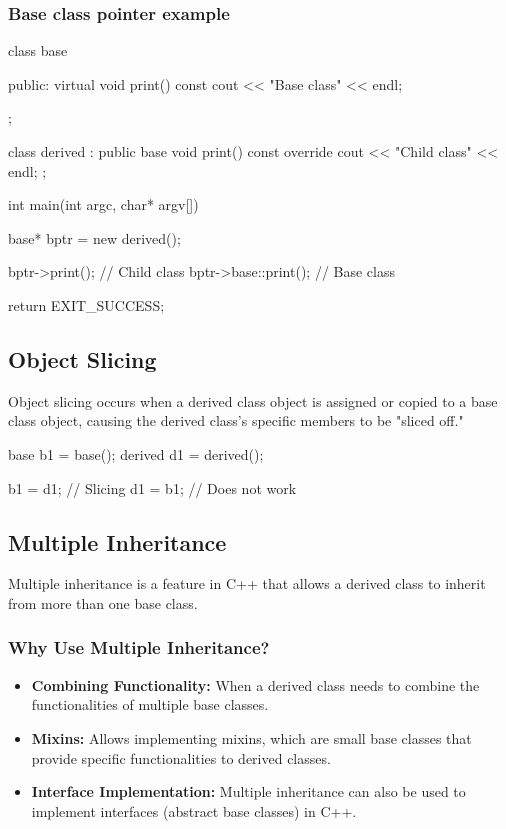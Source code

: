 \documentclass{report}
\begin{document}
    \subsubsection{Base class pointer example}
    \bigbreak \noindent 
    \begin{cppcode}
class base {

public:
    virtual void print() const {
        cout << "Base class" << endl;
    }

};


class derived : public base {
    void print() const override {
        cout << "Child class" << endl;
    }
};


int main(int argc, char* argv[]) {

    base* bptr = new derived();

    bptr->print(); // Child class
    bptr->base::print(); // Base class

    return EXIT_SUCCESS;
}
    \end{cppcode}
    \bigbreak \noindent 

    \bigbreak \noindent 
    \subsection{Object Slicing}
    \bigbreak \noindent 
    Object slicing occurs when a derived class object is assigned or copied to a base class object, causing the derived class's specific members to be "sliced off."
    \bigbreak \noindent 
    \begin{cppcode}
    base b1 = base();
    derived d1 = derived();

    b1 = d1; // Slicing
    d1 = b1; // Does not work
    \end{cppcode}






    \pagebreak 
    \subsection{Multiple Inheritance}
    \bigbreak \noindent 
    Multiple inheritance is a feature in C++ that allows a derived class to inherit from more than one base class.
    \bigbreak \noindent 
    \subsubsection{Why Use Multiple Inheritance?}
    \begin{itemize}
        \item \textbf{Combining Functionality:} When a derived class needs to combine the functionalities of multiple base classes.
        \item \textbf{Mixins:} Allows implementing mixins, which are small base classes that provide specific functionalities to derived classes.
        \item \textbf{Interface Implementation:} Multiple inheritance can also be used to implement interfaces (abstract base classes) in C++.
    \end{itemize}
\end{document}
